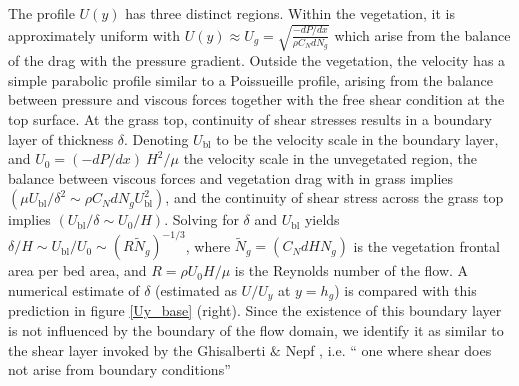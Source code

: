 \documentclass[12pt]{report}   %
\newcommand{\hg}{h_g}
\newcommand{\Rey}{{R}}
\newcommand{\Ndg}{\tilde{N}_g}
\newcommand{\ubl}{U_\text{bl}}
\begin{document}
The profile $U(y)$ has three distinct regions.
Within the vegetation, it is approximately uniform with $ U(y) \approx U_g = \sqrt{\frac{-dP/dx}{\rho C_N dN_g}}$ which arise from the balance of the drag with the pressure gradient. 
Outside the vegetation, the velocity has a simple parabolic profile similar to a Poissueille profile, arising from the balance between pressure and viscous forces together with the free shear condition at the top surface. 
At the grass top, continuity of shear stresses results in a boundary layer of thickness $\delta$. Denoting $\ubl$ to be the velocity scale in the boundary layer, and $U_0 = {(-dP/dx)~H^2}/{\mu}$ the velocity scale in the unvegetated region, the balance between viscous forces and vegetation drag with in grass implies $(\mu \ubl/\delta^2 \sim \rho C_N d N_g \ubl^2)$, and the continuity of shear stress across the grass top implies $(\ubl/\delta \sim U_0/H)$.
Solving for $\delta$ and $\ubl$ yields $\delta/H \sim \ubl/U_0 \sim (\Rey \Ndg )^{-1/3}$, where $\Ndg = \left(C_N d H N_g\right)$ is the vegetation frontal area per bed area, and $\Rey=\rho U_0 H/\mu$ is the Reynolds number of the flow. 
A numerical estimate of $\delta$ (estimated as $U/U_y$ at $y=\hg$) is compared with this prediction in figure \ref{Uy_base} (right). Since the existence of this boundary layer is not influenced by the boundary of the flow domain, we identify it as similar to the shear layer invoked by the Ghisalberti $\&$ Nepf \cite{Ghisal02,Nepf04}, i.e. `` one where shear does not arise from boundary conditions''
\end{document}
